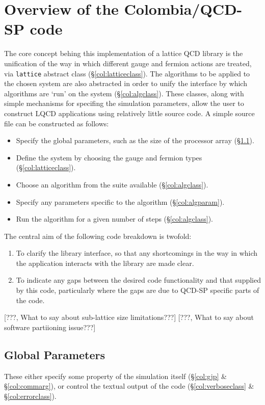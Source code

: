 \documentclass[12pt]{article}
\newcommand{\cde}[1]{{\tt #1}}            %
\begin{document}
\section{Overview of the Colombia/QCD-SP code}
\label{col:code}
The core concept behing this implementation of a lattice QCD library
is the unification of the way in which different gauge and fermion
actions are treated, via \cde{lattice} abstract class
(\S\ref{col:latticeclass}).  The algorithms to be applied to the
chosen system are also abstracted in order to unify the interface by
which algorithms are `run' on the system (\S\ref{col:algclass}).
These classes, along with simple mechanisms for specifing the simulation
parameters, allow the user to construct LQCD applications using
relatively little source code.  A simple source file can be
constructed as follows:
\begin{itemize}
\item Specify the global parameters, such as the size of the
processor array (\S\ref{col:globalparam}).
\item Define the system by choosing the gauge and fermion types
(\S\ref{col:latticeclass}).
\item Choose an algorithm from the suite available
(\S\ref{col:algclass}).
\item Specify any parameters specific to the algorithm (\S\ref{col:algparam}).
\item Run the algorithm for a given number of steps (\S\ref{col:algclass}).
\end{itemize}

The central aim of the following code breakdown is twofold:
\begin{enumerate}
  \item To clarify the library interface, so that any shortcomings in
  the way in which the application interacts with the library are made
  clear.
  \item To indicate any gaps between the desired code functionality
  and that supplied by this code, particularly where the gaps are due
  to QCD-SP specific parts of the code.
\end{enumerate}

[???, What to say about sub-lattice size limitations???]
[???, What to say about software partiioning issue???]

\subsection{Global Parameters}
\label{col:globalparam}
These either specify some property of the simulation itself
(\S\ref{col:gjp} \& \S\ref{col:commarg}), or control the textual output
of the code (\S\ref{col:verboseclass} \& \S\ref{col:errorclass}).
\end{document}
